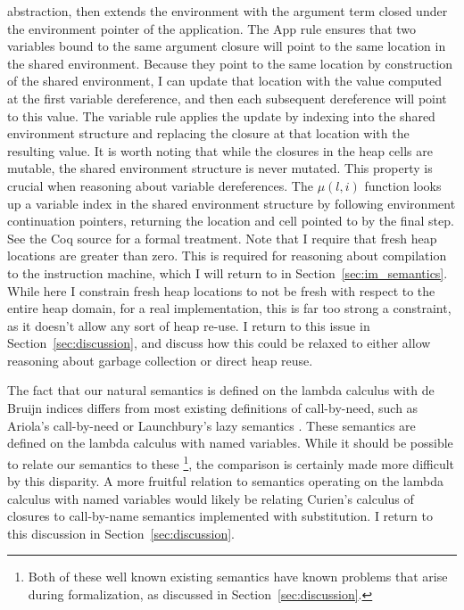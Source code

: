 abstraction, then extends the environment with the argument term closed under the
environment pointer of the application. The App rule ensures that two
variables bound to the same argument closure will point to the same location in
the shared environment. Because they point to the same location by construction
of the shared environment, I can update that location with the value computed
at the first variable dereference, and then each subsequent dereference will
point to this value. The variable rule applies the update by indexing into the
shared environment structure and replacing the closure at that location with the
resulting value. It is worth noting that while the closures in the heap cells
are mutable, the shared environment structure is never mutated. This property is
crucial when reasoning about variable dereferences. The $\mu\left(l, i\right)$
function looks up a variable index in the shared environment structure by
following environment continuation pointers, returning the location and cell
pointed to by the final step. See the Coq source
for a formal treatment. Note that I require that fresh heap locations are
greater than zero. This is required for reasoning about compilation to the
instruction machine, which I will return to in Section~\ref{sec:im_semantics}.
While here I constrain fresh heap locations to not be fresh with respect to the
entire heap domain, for a real implementation, this is far too strong a
constraint, as it doesn't allow any sort of heap re-use. I return to this issue
in Section~\ref{sec:discussion}, and discuss how this could be relaxed to either
allow reasoning about garbage collection or direct heap reuse.

The fact that our natural semantics is defined on the lambda calculus with de Bruijn
indices differs from most existing definitions of call-by-need, such as
Ariola's call-by-need \cite{ariola1995call} or Launchbury's lazy semantics
\cite{launchburynatural}. These semantics are defined on the lambda calculus with named
variables. While it should be possible to relate our semantics to these
\footnote{Both of these well known existing semantics have known problems that
arise during formalization, as discussed in Section~\ref{sec:discussion}.}, the
comparison is certainly made more difficult by this disparity. A more fruitful
relation to semantics operating on the lambda calculus with named variables would
likely be relating Curien's calculus of closures to call-by-name semantics
implemented with substitution. I return to this discussion in
Section~\ref{sec:discussion}.

